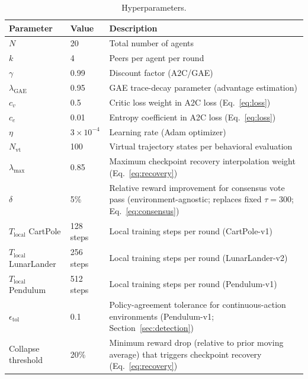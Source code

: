 \documentclass[12pt,a4paper]{article}
\begin{document}
\begin{table}[htbp]
\centering
\caption{Hyperparameters.}
\label{tab:hyperparams}
\begin{tabular}{llp{7cm}}
\toprule
\textbf{Parameter} & \textbf{Value} & \textbf{Description} \\
\midrule
$N$              & 20                 & Total number of agents \\
$k$              & 4                  & Peers per agent per round \\
$\gamma$         & 0.99               & Discount factor (A2C/GAE) \\
$\lambda_{\text{GAE}}$ & 0.95         & GAE trace-decay parameter (advantage estimation) \\
$c_v$            & 0.5                & Critic loss weight in A2C loss (Eq.~\ref{eq:loss}) \\
$c_e$            & 0.01               & Entropy coefficient in A2C loss (Eq.~\ref{eq:loss}) \\
$\eta$           & $3\times10^{-4}$   & Learning rate (Adam optimizer) \\
$N_{\text{vt}}$  & 100                & Virtual trajectory states per behavioral evaluation \\
$\lambda_{\max}$ & 0.85               & Maximum checkpoint recovery interpolation weight (Eq.~\ref{eq:recovery}) \\
$\delta$         & 5\%                & Relative reward improvement for consensus vote pass (environment-agnostic; replaces fixed $\tau=300$; Eq.~\ref{eq:consensus}) \\
$T_{\text{local}}$ CartPole   & 128 steps          & Local training steps per round (CartPole-v1) \\
$T_{\text{local}}$ LunarLander & 256 steps         & Local training steps per round (LunarLander-v2) \\
$T_{\text{local}}$ Pendulum  & 512 steps          & Local training steps per round (Pendulum-v1) \\
$\epsilon_{\text{tol}}$      & 0.1                & Policy-agreement tolerance for continuous-action environments (Pendulum-v1; Section~\ref{sec:detection}) \\
Collapse threshold           & 20\%               & Minimum reward drop (relative to prior moving average) that triggers checkpoint recovery (Eq.~\ref{eq:recovery}) \\
\bottomrule
\end{tabular}
\end{table}
\end{document}
